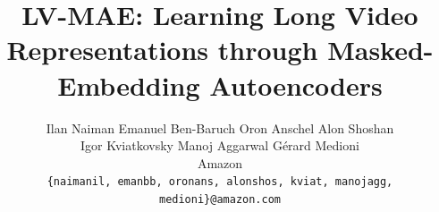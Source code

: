 \documentclass[10pt,twocolumn,letterpaper]{article}
\title{LV-MAE: Learning Long Video Representations through Masked-Embedding Autoencoders}
\author{Ilan Naiman\quad
Emanuel Ben-Baruch\quad 
Oron Anschel\quad
Alon Shoshan\quad \\
Igor Kviatkovsky\quad
Manoj Aggarwal\quad
G\'{e}rard Medioni\\[0.3cm]
Amazon\\
{\tt\small \{naimanil, emanbb, oronans, alonshos, kviat, manojagg, medioni\}@amazon.com}
}
\begin{document}
\maketitle
    






{
    \small
    
    
}







\end{document}
